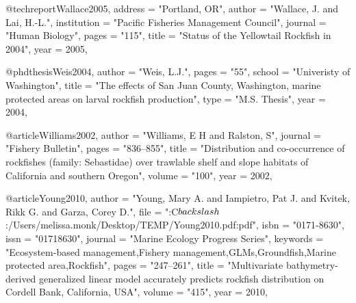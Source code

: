 @techreport{Wallace2005,
    address = "{Portland, OR}",
    author = "{Wallace, J. and Lai, H.-L.}",
    institution = "{Pacific Fisheries Management Council}",
    journal = "{Human Biology}",
    pages = "{115}",
    title = "{{Status of the Yellowtail Rockfish in 2004}}",
    year = 2005,
}

@phdthesis{Weis2004,
    author = "{Weis, L.J.}",
    pages = "{55}",
    school = "{Univeristy of Washington}",
    title = "{{The effects of San Juan County, Washington, marine protected areas on larval rockfish production}}",
    type = "{M.S. Thesis}",
    year = 2004,
}

@article{Williams2002,
    author = "{Williams, E H and Ralston, S}",
    journal = "{Fishery Bulletin}",
    pages = "{836--855}",
    title = "{{Distribution and co-occurrence of rockfishes (family: Sebastidae) over trawlable shelf and slope habitats of California and southern Oregon}}",
    volume = "{100}",
    year = 2002,
}

@article{Young2010,
    author = "{Young, Mary A. and Iampietro, Pat J. and Kvitek, Rikk G. and Garza, Corey D.}",
    file = "{:C$\\backslash$:/Users/melissa.monk/Desktop/TEMP/Young2010.pdf:pdf}",
    isbn = "{0171-8630}",
    issn = "{01718630}",
    journal = "{Marine Ecology Progress Series}",
    keywords = "{Ecosystem-based management,Fishery management,GLMs,Groundfish,Marine protected area,Rockfish}",
    pages = "{247--261}",
    title = "{{Multivariate bathymetry-derived generalized linear model accurately predicts rockfish distribution on Cordell Bank, California, USA}}",
    volume = "{415}",
    year = 2010,
}
